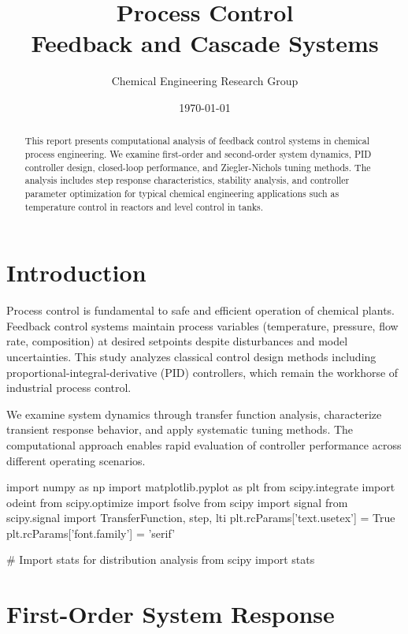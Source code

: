 \documentclass[11pt,a4paper]{article}
\title{Process Control\\Feedback and Cascade Systems}
\author{Chemical Engineering Research Group}
\date{\today}
\begin{document}
\maketitle

\begin{abstract}
This report presents computational analysis of feedback control systems in chemical process engineering. We examine first-order and second-order system dynamics, PID controller design, closed-loop performance, and Ziegler-Nichols tuning methods. The analysis includes step response characteristics, stability analysis, and controller parameter optimization for typical chemical engineering applications such as temperature control in reactors and level control in tanks.
\end{abstract}

\section{Introduction}

Process control is fundamental to safe and efficient operation of chemical plants. Feedback control systems maintain process variables (temperature, pressure, flow rate, composition) at desired setpoints despite disturbances and model uncertainties. This study analyzes classical control design methods including proportional-integral-derivative (PID) controllers, which remain the workhorse of industrial process control.

We examine system dynamics through transfer function analysis, characterize transient response behavior, and apply systematic tuning methods. The computational approach enables rapid evaluation of controller performance across different operating scenarios.

\begin{pycode}

import numpy as np
import matplotlib.pyplot as plt
from scipy.integrate import odeint
from scipy.optimize import fsolve
from scipy import signal
from scipy.signal import TransferFunction, step, lti
plt.rcParams['text.usetex'] = True
plt.rcParams['font.family'] = 'serif'

# Import stats for distribution analysis
from scipy import stats

\end{pycode}

\section{First-Order System Response}
\end{document}
